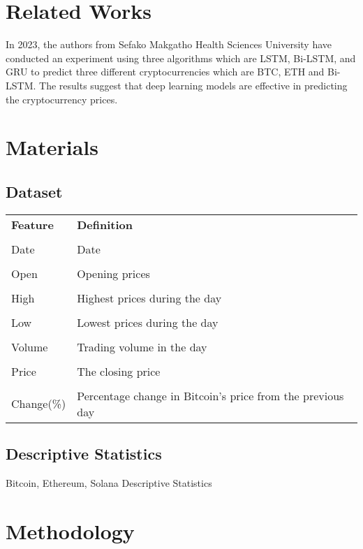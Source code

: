 \documentclass{ieeeojies}
\begin{document}
\section{Related Works}
In 2023, the authors \cite{seabe2023forecasting} from Sefako Makgatho Health Sciences University have conducted an experiment using three algorithms which are LSTM, Bi-LSTM, and GRU to predict three different cryptocurrencies which are BTC, ETH and Bi-LSTM. The results suggest that deep learning models are effective in predicting the cryptocurrency prices.


\section{Materials}
\subsection{Dataset}
\begin{table}[H]
\centering
\begin{tabular}{l l}
 \textbf{Feature} & \textbf{Definition} \\ \\
 Date & Date \\ \\
 Open & Opening prices\\ \\
 High & Highest prices during the day \\ \\
 Low & Lowest prices during the day\\ \\
 Volume & Trading volume in the day\\ \\
Price & The closing price\\ \\
 Change(\%) & Percentage change in Bitcoin's price from the previous day\\
\end{tabular}
\end{table}
\subsection{Descriptive Statistics}
\begin{table}[H]
\caption{Bitcoin, Ethereum, Solana Descriptive Statistics}
\end{table}
\section{Methodology}
\end{document}
